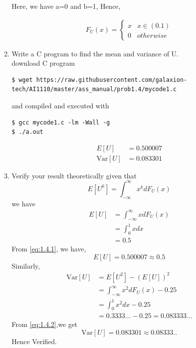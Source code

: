 \documentclass[journal,12pt,twocolumn]{IEEEtran}
\renewcommand\thesection{\arabic{section}}
\begin{document}
\begin{enumerate}[label=\thesection.\arabic*.,ref=\thesection.\theenumi]
    Here, we have a=0 and b=1, Hence,
    
    \begin{align}
    F_U(x) =  \begin{cases}
        x& x \in (0.1) \\
        0 & otherwise
    \end{cases} 
\end{align}

\item Write a C program to find the mean and variance of U.\\

\solution download C program

\begin{lstlisting}
$ wget https://raw.githubusercontent.com/galaxion-tech/AI1110/master/ass_manual/prob1.4/mycode1.c
        \end{lstlisting}
        and compiled and executed with
        \begin{lstlisting}
$ gcc mycode1.c -lm -Wall -g
$ ./a.out
        \end{lstlisting}
    \begin{align}
        E[U] &= 0.500007  \label{eq:1.4.1}\\
        \text{Var}[U] &= 0.083301 \label{eq:1.4.2}
    \end{align}
\item Verify your result theoretically given that 
    \begin{equation}
        E[U^k] = \int_{- \infty}^{\infty} x^k dF_U(x)
    \end{equation}
    \solution we have 
    \begin{align}
        E[U] &= \int_{-\infty}^{\infty} xdF_U(x) \\
        &= \int_{0}^1 x dx \\
        &=  0.5
    \end{align}
    From \eqref{eq:1.4.1}, we have, 
    \begin{equation}
        E[U] = 0.500007 \approx 0.5
    \end{equation}
    Similarly,
    \begin{align}
        \text{Var}[U]&=E[U^2]-(E[U])^2 \\
        &=\int_{-\infty}^{\infty}x^2dF_U(x) - 0.25\\
        &=\int_{0}^{1}x^2dx - 0.25\\
        &=0.3333...-0.25=0.083333...
    \end{align}
    From \eqref{eq:1.4.2},we get
    \begin{equation}
        \text{Var}[U] = 0.083301 \approx 0.08333..
    \end{equation}
    Hence Verified.
\end{enumerate}
\end{document}
